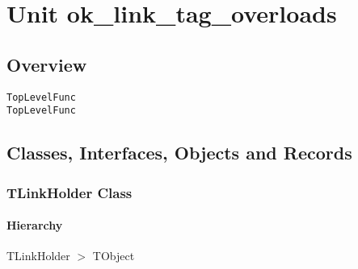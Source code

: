 \documentclass{report}
\begin{document}
\newlength{\tmplength}
\chapter{Unit ok{\_}link{\_}tag{\_}overloads}
\section{Overview}
\begin{description}
\item[\texttt{\begin{ttfamily}TLinkHolder\end{ttfamily} Class}]
\item[\texttt{\begin{ttfamily}TOverloadedBase\end{ttfamily} Class}]
\item[\texttt{\begin{ttfamily}TOverloadedMethods\end{ttfamily} Class}]
\end{description}
\begin{description}
\item[\texttt{TopLevelFunc}]
\item[\texttt{TopLevelFunc}]
\end{description}
\section{Classes, Interfaces, Objects and Records}
\subsection*{TLinkHolder Class}
\subsubsection*{\large{\textbf{Hierarchy}}\normalsize\hspace{1ex}\hfill}
TLinkHolder {$>$} TObject
\end{document}
